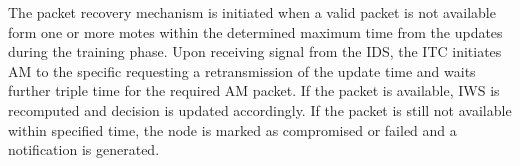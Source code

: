 \documentclass[conference,final]{IEEEtran}
\begin{document}
The packet recovery mechanism is initiated when a valid packet is not available form one or more motes within  the  determined maximum time from the updates  during the training phase.
Upon receiving signal from the IDS, the ITC initiates AM to the specific requesting a retransmission of the update time and waits further  triple time for the required AM packet. If the packet is available,  IWS is recomputed and decision is updated accordingly.
If the packet is still not available within specified time, the node is marked as compromised or failed and a notification is generated.






%    
%
%
%

%
%
\end{document}
